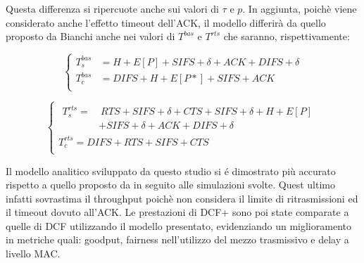 
Questa differenza si ripercuote anche sui valori di $\tau$ e $p$.
In aggiunta, poich\`e viene considerato anche l'effetto timeout dell'ACK, il modello differir\`a da quello proposto da Bianchi anche nei valori di $T^{bas}$ e $T^{rts}$ che saranno, rispettivamente:

$$
\begin{cases}
T_{s}^{bas} &= H + E[P] + SIFS + \delta + ACK + DIFS + \delta \\
T_{c}^{bas} &= DIFS + H + E[P*] + SIFS + ACK \\
\end{cases}
$$

$$
\begin{cases}
\!\begin{aligned}
T_{s}^{rts} =  &\ RTS + SIFS + \delta + CTS + SIFS + \delta + H + E[P]  \\ & + SIFS + \delta + ACK + DIFS + \delta 
\end{aligned}
\\
T_{c}^{rts} = DIFS + RTS + SIFS + CTS \\
\end{cases}
$$

Il modello analitico sviluppato da questo studio si \'e dimostrato pi\`u accurato rispetto a quello proposto da \cite{bianchi2000performance} in seguito alle simulazioni svolte.
Quest ultimo infatti sovrastima il throughput poich\`e non considera il limite di ritrasmissioni ed il timeout dovuto all'ACK.
Le prestazioni di DCF+ sono poi state comparate a quelle di DCF utilizzando il modello presentato, evidenziando un miglioramento in metriche quali: goodput, fairness nell'utilizzo del mezzo trasmissivo e delay a livello MAC.